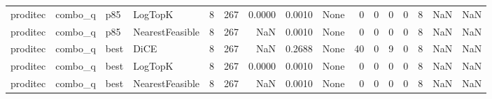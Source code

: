 \begin{tabular}{llllrrrrlrrrrrrr}
proditec &              combo\_q &    p85 &         LogTopK &            8 &                  267 &                   0.0000 &      0.0010 &                                               None &      0 &            0 &        0 &              0 &          8 &                NaN &            NaN \\
proditec &              combo\_q &    p85 & NearestFeasible &            8 &                  267 &                      NaN &      0.0010 &                                               None &      0 &            0 &        0 &              0 &          8 &                NaN &            NaN \\
proditec &              combo\_q &   best &            DiCE &            8 &                  267 &                      NaN &      0.2688 &                                               None &     40 &            0 &        9 &              0 &          8 &                NaN &            NaN \\
proditec &              combo\_q &   best &         LogTopK &            8 &                  267 &                   0.0000 &      0.0010 &                                               None &      0 &            0 &        0 &              0 &          8 &                NaN &            NaN \\
proditec &              combo\_q &   best & NearestFeasible &            8 &                  267 &                      NaN &      0.0010 &                                               None &      0 &            0 &        0 &              0 &          8 &                NaN &            NaN \\
\bottomrule
\end{tabular}
